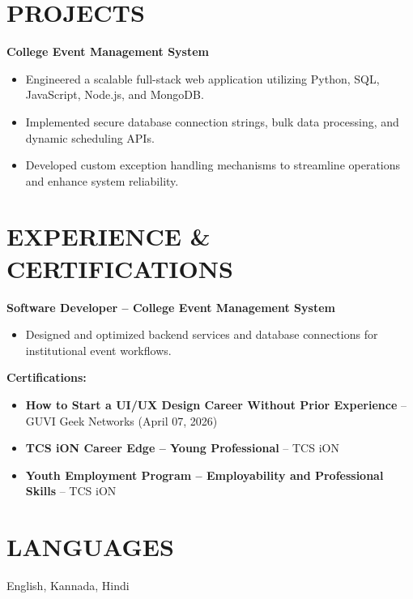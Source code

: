 \documentclass{article}
\begin{document}
\section*{PROJECTS}
\textbf{College Event Management System} \\
\begin{itemize}[leftmargin=*, nosep]
    \item Engineered a scalable full-stack web application utilizing Python, SQL, JavaScript, Node.js, and MongoDB.
    \item Implemented secure database connection strings, bulk data processing, and dynamic scheduling APIs.
    \item Developed custom exception handling mechanisms to streamline operations and enhance system reliability.
\end{itemize}

\section*{EXPERIENCE \& CERTIFICATIONS}
\textbf{Software Developer – College Event Management System}
\begin{itemize}[leftmargin=*, nosep]
    \item Designed and optimized backend services and database connections for institutional event workflows.
\end{itemize}

\vspace{6pt}
\textbf{Certifications:}
\begin{itemize}[leftmargin=*, nosep]
    \item \textbf{How to Start a UI/UX Design Career Without Prior Experience} – GUVI Geek Networks (April 07, 2026)
    \item \textbf{TCS iON Career Edge – Young Professional} – TCS iON
    \item \textbf{Youth Employment Program – Employability and Professional Skills} – TCS iON
\end{itemize}

\section*{LANGUAGES}
English, Kannada, Hindi
\end{document}
